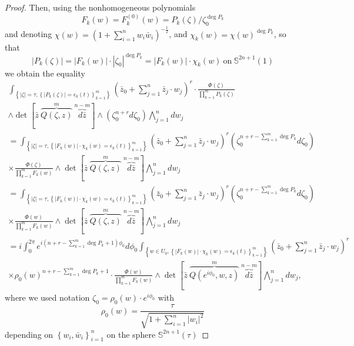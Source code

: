 \documentclass[11pt,reqno]{amsart}
\numberwithin{equation}{section}
\begin{document}
\begin{proof}
\indent
Then, using the nonhomogeneous polynomials
\begin{equation}\label{Polynomials}
F_k(w)=F^{(0)}_k(w)=P_k(\zeta)/\zeta_0^{\deg P_k}
\end{equation}
and denoting $\chi(w)=\left(1+\sum_{i=1}^n w_i{\bar w}_i\right)^{-\frac{1}{2}}$,
and $\chi_k(w)=\chi(w)^{\deg P_k}$, so that
$$\left|P_k(\zeta)\right|=|F_k(w)|\cdot|\zeta_0|^{\deg P_k}=|F_k(w)|\cdot\chi_k(w)\
\text{on}\ {{\mathbb S}}^{2n+1}(1)$$
we obtain the equality
\begin{multline}\label{LocalIntegralEquality}
\int_{\left\{|\zeta|=\tau,\left\{|P_k(\zeta)|=\epsilon_k(t)\right\}_{k=1}^m\right\}}
\left({\bar z}_0+\sum_{j=1}^n{\bar z}_j\cdot w_j\right)^r\cdot
\frac{\Phi(\zeta)}{\prod_{k=1}^mP_k(\zeta)}\\
\wedge\det\left[{\bar z}\ \overbrace{Q(\zeta,z)}^{m}\ \overbrace{d{\bar z}}^{n-m}\right]
\wedge \left(\zeta_0^{n+r}d\zeta_0\right)\bigwedge_{j=1}^n dw_j\\
=\int_{\left\{|\zeta|=\tau,\left\{|F_k(w)|\cdot\chi_k(w)=\epsilon_k(t)\right\}_{k=1}^m\right\}}
\left({\bar z}_0+\sum_{j=1}^n{\bar z}_j\cdot w_j\right)^r
\left(\zeta_0^{n+r-\sum_{k=1}^m \deg P_k}d\zeta_0\right)\\
\times\frac{\Phi(\zeta)}{\prod_{k=1}^mF_k(w)}
\wedge\det\left[{\bar z}\ \overbrace{Q(\zeta,z)}^{m}\ \overbrace{d{\bar z}}^{n-m}\right]
\bigwedge_{j=1}^n dw_j\\
=\int_{\left\{|\zeta|=\tau,\left\{|F_k(w)|\cdot\chi_k(w)=\epsilon_k(t)\right\}_{k=1}^m\right\}}
\left({\bar z}_0+\sum_{j=1}^n{\bar z}_j\cdot w_j\right)^r
\left(\zeta_0^{n+r-\sum_{k=1}^m \deg P_k}d\zeta_0\right)\\
\times\frac{\Phi(w)}{\prod_{k=1}^m F_k(w)}
\wedge\det\left[{\bar z}\ \overbrace{Q(\zeta,z)}^{m}\ \overbrace{d{\bar z}}^{n-m}\right]
\bigwedge_{j=1}^n dw_j\\
=i\int_0^{2\pi}e^{i\left(n+r-\sum_{k=1}^m \deg P_k+1\right)\phi_0}d\phi_0
\int_{\left\{w\in U_0,\left\{|F_k(w)|\cdot\chi_k(w)=\epsilon_k(t)\right\}_{k=1}^m\right\}}
\left({\bar z}_0+\sum_{j=1}^n{\bar z}_j\cdot w_j\right)^r\\
\times\rho_0(w)^{n+r-\sum_{k=1}^m \deg P_k+1}
\cdot\frac{\Phi(w)}{\prod_{k=1}^m F_k(w)}
\wedge\det\left[{\bar z}\ \overbrace{Q(e^{i\phi_0},w,z)}^{m}\
\overbrace{d{\bar z}}^{n-m}\right]\bigwedge_{j=1}^n dw_j,
\end{multline}
where we used notation $\zeta_0=\rho_0(w)\cdot e^{i\phi_0}$ with
$$\rho_0(w)=\frac{\tau}{\sqrt{1+\sum_{i=1}^n|w_i|^2}}$$
depending on $\left\{w_i,{\bar w}_i\right\}_{i=1}^n$ on the sphere ${{\mathbb S}}^{2n+1}(\tau)$

\end{proof}
\end{document}
